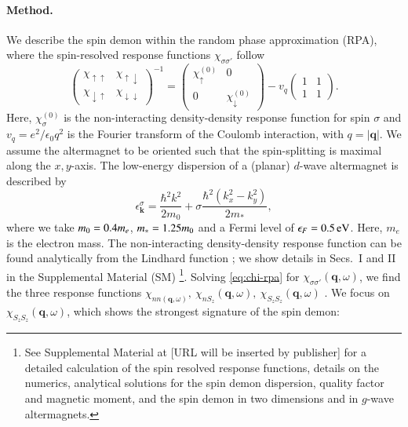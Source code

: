 \documentclass[aps,prl,reprint,twocolumns,superscriptaddress]{revtex4-2}
\begin{document}
	\paragraph{Method.}
	We describe the spin demon within the random phase approximation (RPA), where the spin-resolved response functions $\chi_{\sigma\sigma'}$ follow \cite{giulianiQuantumTheoryElectron2005}
	\begin{equation}
		\begin{pmatrix}
			\chi_{\uparrow\uparrow} & \chi_{\uparrow\downarrow} \\ 
			\chi_{\downarrow\uparrow} & \chi_{\downarrow\downarrow}
		\end{pmatrix}^{-1} = \begin{pmatrix}
			\chi_\uparrow^{(0)} & 0 \\
			0 & \chi_\downarrow^{(0)}
		\end{pmatrix}
		- v_q \begin{pmatrix}
			1 & 1 \\ 1 & 1 
		\end{pmatrix} \label{eq:chi-rpa}.
	\end{equation}
	Here, $\chi_\sigma^{(0)}$ is the non-interacting density-density response function for spin $\sigma$ and $v_q=e^2/\epsilon_0 q^2$ is the Fourier transform of the Coulomb interaction, with $q=|\bm q|$. We assume the altermagnet to be oriented such that the spin-splitting is maximal along the $x,y$-axis. The low-energy dispersion of a (planar) $d$-wave altermagnet is  described by \cite{smejkalEmergingResearchLandscape2022}
	\begin{equation}
		\epsilon_{\bm k}^\sigma = \frac{\hbar^2 k^2}{2m_0} + \sigma\frac{\hbar^2 \left( k_x^2-k_y^2\right)}{2m_*} ,
	\end{equation}
	where we take $m_0=0.4 m_e$, $m_*=1.25 m_0$ and a Fermi level of $\epsilon_F=\SI{0.5}{eV}$. Here, $m_e$ is the electron mass.
	The non-interacting density-density response function can  be found analytically from the Lindhard function \cite{ahnAnisotropicFermionicQuasiparticles2021}; we show details in Secs.~I and II in the Supplemental Material (SM) \footnote{See Supplemental Material at [URL will be inserted by publisher] for a detailed calculation of the spin resolved response functions, details on the numerics, analytical solutions for the spin demon dispersion, quality factor and magnetic moment, and the spin demon in two dimensions and in $g$-wave altermagnets.}. Solving \cref{eq:chi-rpa} for $\chi_{\sigma\sigma'}(\bm q,\omega)$, we find the three response functions $\chi_{nn(\bm q,\omega)},\ \chi_{nS_z}(\bm q,\omega),\ \chi_{S_zS_z}(\bm q,\omega)$ \cite{giulianiQuantumTheoryElectron2005}. We focus on $\chi_{S_zS_z}(\bm q,\omega)$, which shows the strongest signature of the spin demon:
\end{document}
